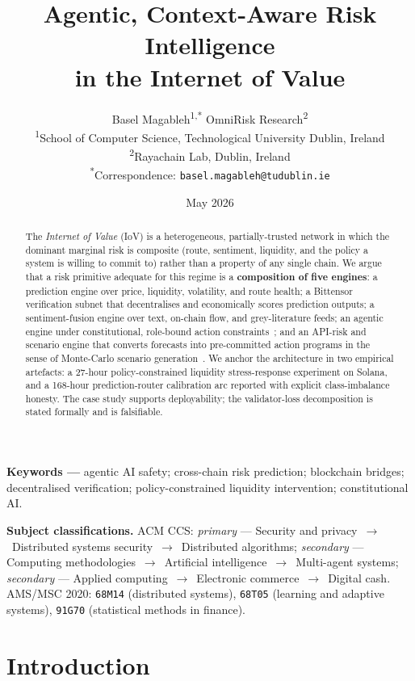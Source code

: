 \documentclass[11pt,a4paper]{article}
\title{Agentic, Context-Aware Risk Intelligence\\
       in the Internet of Value}
\author{%
  Basel Magableh\textsuperscript{1,*} \quad\quad OmniRisk Research\textsuperscript{2} \\[0.8em]
  \normalsize\textsuperscript{1}School of Computer Science, Technological University Dublin, Ireland \\
  \normalsize\textsuperscript{2}Rayachain Lab, Dublin, Ireland \\[0.4em]
  \normalsize\textsuperscript{*}Correspondence: \texttt{basel.magableh@tudublin.ie}
}
\date{May 2026}
\begin{document}
\maketitle

\begin{abstract}
The \emph{Internet of Value} (IoV) is a heterogeneous, partially-trusted
network in which the dominant marginal risk is composite (route,
sentiment, liquidity, and the policy a system is willing to commit to)
rather than a property of any single chain. We argue that a risk primitive
adequate for this regime is a \textbf{composition of five engines}: a
prediction engine over price, liquidity, volatility, and route health; a
Bittensor verification subnet that decentralises and economically scores
prediction outputs; a sentiment-fusion engine over text, on-chain flow,
and grey-literature feeds; an agentic engine under constitutional,
role-bound action constraints~\cite{bai2022constitutional}; and an
API-risk and scenario engine that converts forecasts into pre-committed
action programs in the sense of Monte-Carlo scenario
generation~\cite{glasserman2003monte}. We anchor the architecture in two
empirical artefacts: a 27-hour policy-constrained liquidity
stress-response experiment on Solana, and a 168-hour prediction-router
calibration arc reported with explicit class-imbalance honesty. The case
study supports deployability; the validator-loss decomposition is stated
formally and is falsifiable.
\end{abstract}

\medskip
\noindent\textbf{Keywords ---} agentic AI safety; cross-chain risk
prediction; blockchain bridges; decentralised verification;
policy-constrained liquidity intervention; constitutional AI.

\smallskip
\noindent\textbf{Subject classifications.} ACM CCS: \emph{primary} ---
Security and privacy~$\to$~Distributed systems security~$\to$~Distributed
algorithms; \emph{secondary} --- Computing methodologies~$\to$~Artificial
intelligence~$\to$~Multi-agent systems; \emph{secondary} --- Applied
computing~$\to$~Electronic commerce~$\to$~Digital cash. AMS/MSC 2020:
\texttt{68M14} (distributed systems), \texttt{68T05} (learning and
adaptive systems), \texttt{91G70} (statistical methods in finance).

\section{Introduction}\label{sec:intro}
\end{document}
